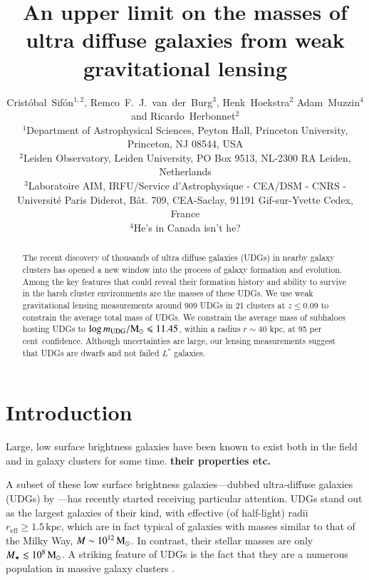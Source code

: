 \documentclass[usenatbib,fleqn]{mnras}
\title[Weak lensing masses of UDGs]{An upper limit on the masses of ultra diffuse galaxies from weak gravitational lensing}
\author[C.\ Sif\'on, R.\ F.\ J.\ van der Burg, H.\ Hoekstra, A.\ Muzzin \& R.\ Herbonnet]
  {
      Crist\'obal~Sif\'on$^{1,2}$,
      Remco~F.~J.~van~der~Burg$^3$,
      Henk~Hoekstra$^2$
      Adam~Muzzin$^4$
      and
      \newauthor
      Ricardo~Herbonnet$^2$
\\
      $^1$Department of Astrophysical Sciences, Peyton Hall, Princeton University, Princeton, NJ 08544, USA\\
      $^2$Leiden Observatory, Leiden University, PO Box 9513, NL-2300 RA Leiden, Netherlands\\
      $^3$Laboratoire AIM, IRFU/Service d'Astrophysique - CEA/DSM - CNRS - Universit\'e Paris Diderot, B\^at. 709, CEA-Saclay, 91191 Gif-sur-Yvette Cedex, France\\
      $^4$He's in Canada isn't he?
  }
\def\percent{ per cent}
\def\reff{r_\mathrm{eff}}
\begin{document}
\label{firstpage}
\pagerange{\pageref{firstpage}--\pageref{lastpage}}

\maketitle

\begin{abstract}
        The recent discovery of thousands of ultra diffuse galaxies (UDGs) in nearby galaxy clusters has opened a new window into the process of galaxy formation and evolution. Among the key features that could reveal their formation history and ability to survive in the harsh cluster environments are the masses of these UDGs. We use weak gravitational lensing measurements around 909 UDGs in 21 clusters at $z\leq0.09$ to constrain the average total mass of UDGs. We constrain the average mass of subhaloes hosting UDGs to $\log m_{\rm UDG}/\mathrm{M}_\odot\leqslant11.45$, within a radius $r\sim40$ kpc, at 95\percent\ confidence. Although uncertainties are large, our lensing measurements suggest that UDGs are dwarfs and not failed $L^*$ galaxies.
\end{abstract}

\section{Introduction}
\label{s:intro}

Large, low surface brightness galaxies have been known to exist both in the field \citep{} and in galaxy clusters \citep{} for some time. \textbf{their properties etc.}

A subset of these low surface brightness galaxies---dubbed ultra-diffuse galaxies (UDGs) by \cite{vandokkum15_coma}---has recently started receiving particular attention. UDGs stand out as the largest galaxies of their kind, with effective (of half-light) radii $\reff\geq1.5\,\mathrm{kpc}$, which are in fact typical of galaxies with masses similar to that of the Milky Way, $M\sim10^{12}\,\mathrm{M}_\odot$. In contrast, their stellar masses are only $M_\star\lesssim10^8\,\mathrm{M}_\odot$. A striking feature of UDGs is the fact that they are a numerous population in massive galaxy clusters \citep{vandokkum15_coma,koda15,mihos15,yagi16,vdburg16}.
\end{document}
